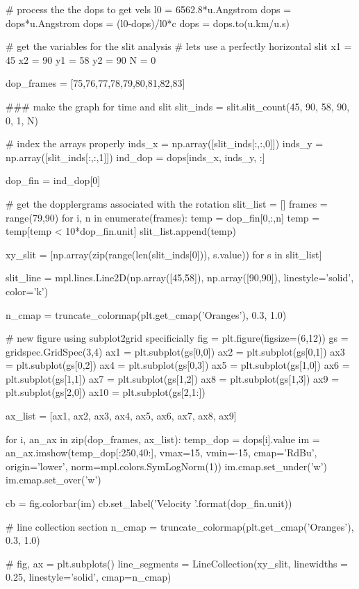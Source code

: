 \documentclass{emulateapj}
\begin{document}
\begin{pycode}[doppler]
# process the the dops to get vels
l0 = 6562.8*u.Angstrom
dops = dops*u.Angstrom
dops = (l0-dops)/l0*c
dops = dops.to(u.km/u.s)

# get the variables for the slit analysis
# lets use a perfectly horizontal slit
x1 = 45
x2 = 90
y1 = 58
y2 = 90
N = 0

dop_frames = [75,76,77,78,79,80,81,82,83]

### make the graph for time and slit
slit_inds = slit.slit_count(45, 90, 58, 90, 0, 1, N)

# index the arrays properly
inds_x = np.array([slit_inds[:,:,0]])
inds_y = np.array([slit_inds[:,:,1]])
ind_dop = dops[inds_x, inds_y, :]

dop_fin = ind_dop[0]


# get the dopplergrams associated with the rotation
slit_list = []
frames = range(79,90)
for i, n in enumerate(frames):
    temp = dop_fin[0,:,n]
    temp = temp[temp < 10*dop_fin.unit]
    slit_list.append(temp)

xy_slit = [np.array(zip(range(len(slit_inds[0])), s.value)) for s in slit_list]

slit_line =  mpl.lines.Line2D(np.array([45,58]),
                                     np.array([90,90]),
                                     linestyle='solid', color='k')

n_cmap = truncate_colormap(plt.get_cmap('Oranges'), 0.3, 1.0)

# new figure using subplot2grid specificially
fig = plt.figure(figsize=(6,12))
gs = gridspec.GridSpec(3,4)
ax1 = plt.subplot(gs[0,0])
ax2 = plt.subplot(gs[0,1])
ax3 = plt.subplot(gs[0,2])
ax4 = plt.subplot(gs[0,3])
ax5 = plt.subplot(gs[1,0])
ax6 = plt.subplot(gs[1,1])
ax7 = plt.subplot(gs[1,2])
ax8 = plt.subplot(gs[1,3])
ax9 = plt.subplot(gs[2,0])
ax10 = plt.subplot(gs[2,1:])
 
ax_list = [ax1, ax2, ax3, ax4, ax5,
           ax6, ax7, ax8, ax9]

for i, an_ax in zip(dop_frames, ax_list):
    temp_dop = dops[i].value
    im = an_ax.imshow(temp_dop[:250,40:], vmax=15, vmin=-15,
             cmap='RdBu', origin='lower',
             norm=mpl.colors.SymLogNorm(1))
    im.cmap.set_under('w')
    im.cmap.set_over('w')

cb = fig.colorbar(im)
cb.set_label('Velocity {}'.format(dop_fin.unit))

# line collection section
n_cmap = truncate_colormap(plt.get_cmap('Oranges'), 0.3, 1.0)

# fig, ax = plt.subplots()
line_segments = LineCollection(xy_slit,
                               linewidths = 0.25,
                               linestyle='solid',
                               cmap=n_cmap)


\end{pycode}
\end{document}
